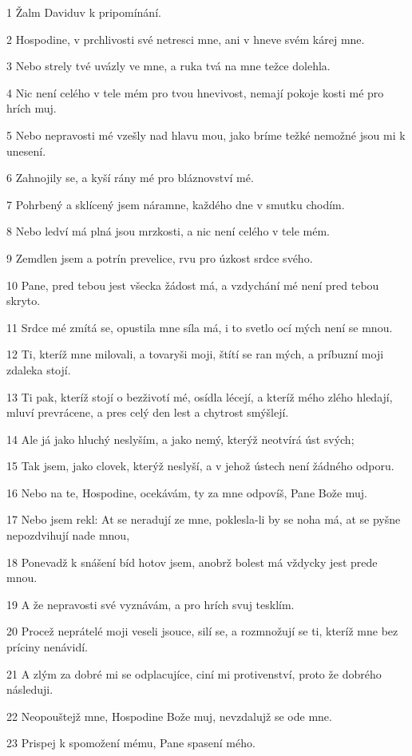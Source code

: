 \par 1 Žalm Daviduv k pripomínání.
\par 2 Hospodine, v prchlivosti své netresci mne, ani v hneve svém kárej mne.
\par 3 Nebo strely tvé uvázly ve mne, a ruka tvá na mne težce dolehla.
\par 4 Nic není celého v tele mém pro tvou hnevivost, nemají pokoje kosti mé pro hrích muj.
\par 5 Nebo nepravosti mé vzešly nad hlavu mou, jako bríme težké nemožné jsou mi k unesení.
\par 6 Zahnojily se, a kyší rány mé pro bláznovství mé.
\par 7 Pohrbený a sklícený jsem náramne, každého dne v smutku chodím.
\par 8 Nebo ledví má plná jsou mrzkosti, a nic není celého v tele mém.
\par 9 Zemdlen jsem a potrín prevelice, rvu pro úzkost srdce svého.
\par 10 Pane, pred tebou jest všecka žádost má, a vzdychání mé není pred tebou skryto.
\par 11 Srdce mé zmítá se, opustila mne síla má, i to svetlo ocí mých není se mnou.
\par 12 Ti, kteríž mne milovali, a tovaryši moji, štítí se ran mých, a príbuzní moji zdaleka stojí.
\par 13 Ti pak, kteríž stojí o bezživotí mé, osídla lécejí, a kteríž mého zlého hledají, mluví prevrácene, a pres celý den lest a chytrost smýšlejí.
\par 14 Ale já jako hluchý neslyším, a jako nemý, kterýž neotvírá úst svých;
\par 15 Tak jsem, jako clovek, kterýž neslyší, a v jehož ústech není žádného odporu.
\par 16 Nebo na te, Hospodine, ocekávám, ty za mne odpovíš, Pane Bože muj.
\par 17 Nebo jsem rekl: At se neradují ze mne, poklesla-li by se noha má, at se pyšne nepozdvihují nade mnou,
\par 18 Ponevadž k snášení bíd hotov jsem, anobrž bolest má vždycky jest prede mnou.
\par 19 A že nepravosti své vyznávám, a pro hrích svuj tesklím.
\par 20 Procež neprátelé moji veseli jsouce, silí se, a rozmnožují se ti, kteríž mne bez príciny nenávidí.
\par 21 A zlým za dobré mi se odplacujíce, ciní mi protivenství, proto že dobrého následuji.
\par 22 Neopouštejž mne, Hospodine Bože muj, nevzdalujž se ode mne.
\par 23 Prispej k spomožení mému, Pane spasení mého.

